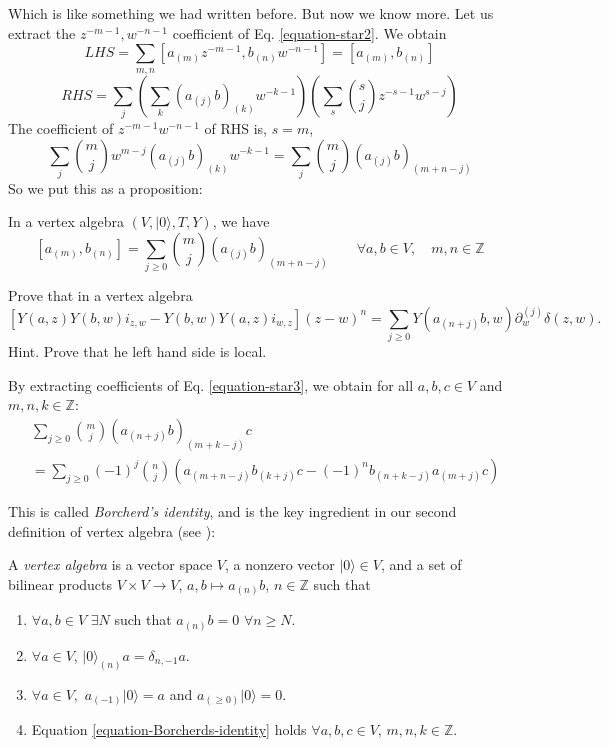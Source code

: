 Which is like something we had written
before.
But now we know more. Let us extract
the $z^{-m-1},w^{-n-1}$ coefficient of Eq.
\ref{equation-star2}.
We obtain
$$
LHS=\sum_{m,n}[a_{(m)}z^{-m-1},b_{(n)}w^{-n-
1}]=[a_{(m)},b_{(n)}]
$$
$$
RHS=\sum_{j}\left(\sum_{k}(a_{(j)}b)_{(k)}
w^{-k-1}\right)
\left(\sum_{s}\binom{s}{j}z^{-s-1}w^{s-j}
\right)
$$
The coefficient of $z^{-m-1}w^{-n-1}$ of RHS
is, $s=m$,
$$
\sum_{j}\binom{m}{j}w^{m-j}(a_{(j)}b)_{(k)}
w^{-k-1}
=\sum_{j}\binom{m}{j}(a_{(j)}b)_{(m+n-j)}
$$
So we put this as a proposition:
\begin{proposition}
\label{proposition-commutator-formula}
In a vertex algebra $(V,|0\rangle,T,Y)$, we
have
$$
[a_{(m)},b_{(n)}]=\sum_{j \geq
0}\binom{m}{j}(a_{(j)}b)_{(m+n-j)}
\qquad \forall a,b \in V,\quad m,n\in
\mathbb{Z}
$$
\end{proposition}

\begin{exercise}
\label{exercise-its-what-it-is}
Prove that in a vertex algebra
\begin{equation}
\label{equation-star3}
[Y(a,z)Y(b,w)i_{z,w}-Y(b,w)Y(a,z)i_{w,z}](z-
w)^n
=\sum_{j \geq
0}Y(a_{(n+j)}b,w)\partial_w^{(j)}\delta(z,w).
\end{equation}
Hint. Prove that he left hand side is local.
\end{exercise}

By extracting coefficients of Eq.
\ref{equation-star3}, we obtain
for all $a,b,c \in V$ and $m,n,k \in
\mathbb{Z}$:
\begin{equation}
\label{equation-Borcherds-identity}
\begin{aligned}
&\sum_{j \geq
0}\binom{m}{j}(a_{(n+j)}b)_{(m+k-j)}c\\
&=\sum_{j \geq 0}(-1)^j \binom{n}{j}
\left(a_{(m+n-j)}b_{(k+j)}c-(-1)^nb_{(n+k-j)}
a_{(m+j)}c\right)
\end{aligned}
\end{equation}

This is called {\it Borcherd's identity}, and
is the key
ingredient in our second definition of vertex
algebra
(see \cite[Proposition 4.8(b)]{VAFB}):

\begin{definition}
\label{definition-vertex-algebra2}
A {\it vertex algebra} is a vector space $V$,
a nonzero vector $|0\rangle\in V$,
and a set of bilinear products
$V \times V \to V$, $a,b \mapsto a_{(n)}b$,
$n \in \mathbb{Z}$
such that
\begin{enumerate}
\item $\forall a,b \in V$ $\exists N$ such
that $a_{(n)}b=0$
$\forall n \geq N$.
\item $\forall  a \in V$,
$|0\rangle_{(n)}a=\delta_{n,-1}a$.
\item $\forall a \in V,$ $a_{(-1)}|0\rangle
=a$ and $a_{(\geq 0)}|0\rangle=0$.
\item Equation
\ref{equation-Borcherds-identity} holds
$\forall a,b,c \in V$, $m,n,k \in
\mathbb{Z}$.
\end{enumerate}
\end{definition}

